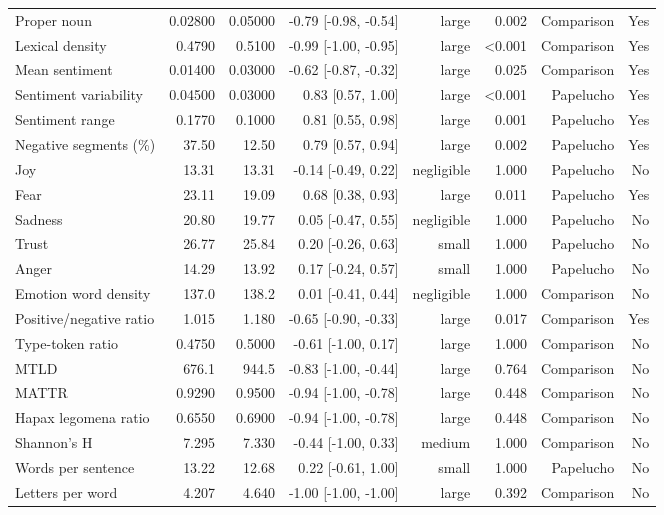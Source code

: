 \begin{table}[htbp]
\begin{tabular}{lrrrrrrr}
Proper noun & 0.02800 & 0.05000 & -0.79 [-0.98, -0.54] & large & 0.002 & Comparison & Yes \\
Lexical density & 0.4790 & 0.5100 & -0.99 [-1.00, -0.95] & large & <0.001 & Comparison & Yes \\
Mean sentiment & 0.01400 & 0.03000 & -0.62 [-0.87, -0.32] & large & 0.025 & Comparison & Yes \\
Sentiment variability & 0.04500 & 0.03000 & 0.83 [0.57, 1.00] & large & <0.001 & Papelucho & Yes \\
Sentiment range & 0.1770 & 0.1000 & 0.81 [0.55, 0.98] & large & 0.001 & Papelucho & Yes \\
Negative segments (\%) & 37.50 & 12.50 & 0.79 [0.57, 0.94] & large & 0.002 & Papelucho & Yes \\
Joy & 13.31 & 13.31 & -0.14 [-0.49, 0.22] & negligible & 1.000 & Papelucho & No \\
Fear & 23.11 & 19.09 & 0.68 [0.38, 0.93] & large & 0.011 & Papelucho & Yes \\
Sadness & 20.80 & 19.77 & 0.05 [-0.47, 0.55] & negligible & 1.000 & Papelucho & No \\
Trust & 26.77 & 25.84 & 0.20 [-0.26, 0.63] & small & 1.000 & Papelucho & No \\
Anger & 14.29 & 13.92 & 0.17 [-0.24, 0.57] & small & 1.000 & Papelucho & No \\
Emotion word density & 137.0 & 138.2 & 0.01 [-0.41, 0.44] & negligible & 1.000 & Comparison & No \\
Positive/negative ratio & 1.015 & 1.180 & -0.65 [-0.90, -0.33] & large & 0.017 & Comparison & Yes \\
Type-token ratio & 0.4750 & 0.5000 & -0.61 [-1.00, 0.17] & large & 1.000 & Comparison & No \\
MTLD & 676.1 & 944.5 & -0.83 [-1.00, -0.44] & large & 0.764 & Comparison & No \\
MATTR & 0.9290 & 0.9500 & -0.94 [-1.00, -0.78] & large & 0.448 & Comparison & No \\
Hapax legomena ratio & 0.6550 & 0.6900 & -0.94 [-1.00, -0.78] & large & 0.448 & Comparison & No \\
Shannon's H & 7.295 & 7.330 & -0.44 [-1.00, 0.33] & medium & 1.000 & Comparison & No \\
Words per sentence & 13.22 & 12.68 & 0.22 [-0.61, 1.00] & small & 1.000 & Papelucho & No \\
Letters per word & 4.207 & 4.640 & -1.00 [-1.00, -1.00] & large & 0.392 & Comparison & No \\

\end{tabular}
\end{table}
